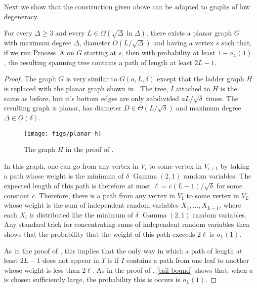 \documentclass[lotsofwhite]{patmorin}
\DeclareMathOperator{\gammarv}{Gamma}
\begin{document}
Next we show that the construction given above can be adapted to graphs
of low degeneracy.

\begin{thm}
  For every $\Delta\ge 3$ and every $L\in\Omega(\sqrt{\Delta}\ln\Delta)$,
  there exists a planar graph $G$ with maximum degree $\Delta$, diameter
  $O(L/\sqrt{\Delta})$ and having a vertex $s$ such that, if we run
  Process~A on $G$ starting at $s$, then with probability at least
  $1-o_L(1)$, the resulting spanning tree contains a path of length at
  least $2L-1$.
\end{thm}

\begin{proof}
  The graph $G$ is very similar to $G(a, L,\delta)$ except that the ladder
  graph $H$ is replaced with the planar graph shown in .
  The tree, $I$ attached to $H$ is the same as before, but it's bottom
  edges are only subdivided $aL/\sqrt{\delta}$ times.  The resulting
  graph is planar, has diameter $D\in\Theta(L/\sqrt{\delta})$ and maximum
  degree $\Delta\in O(\delta)$.

  \begin{figure}
    \begin{center}
      \texttt{[image: figs/planar-h]}
    \end{center}
    \caption{The graph $H$ in the proof of .}
  \end{figure}
 
  In this graph, one can go from any vertex in $V_i$ to some vertex in 
  $V_{i+1}$ by taking a path
  whose weight is the minimum of $\delta$ $\gammarv(2,1)$ random
  variables.  The expected length of this path is therefore at most
  $\ell=c(L-1)/\sqrt{\delta}$ for some constant $c$. Therefore, there is
  a path from any vertex in $V_1$ to some vertex in $V_L$ whose weight is
  the sum of independent random variables $X_1,\ldots,X_{L-1}$, where each
  $X_i$ is distributed like the minimum of $\delta$ $\gammarv(2,1)$ random
  variables. Any standard trick for concentrating sums of independent
  random variables then shows that the probability that the weight of
  this path exceeds $2\ell$ is $o_L(1)$.

  As in the proof of , this implies
  that the only way in which a path of length at least $2L-1$ does not
  appear in $T$ is if $I$ contains a path from one leaf to another whose
  weight is less than $2\ell$.  As in the proof of ,
  \eqref{tail-bound} shows that, when $a$ is chosen sufficiently large,
  the probability this is occurs is $o_L(1)$.
\end{proof}
\end{document}
